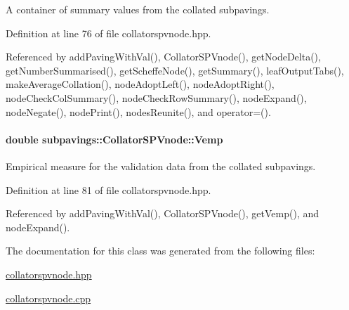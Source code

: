\-A container of summary values from the collated subpavings. 



\-Definition at line 76 of file collatorspvnode.\-hpp.



\-Referenced by add\-Paving\-With\-Val(), \-Collator\-S\-P\-Vnode(), get\-Node\-Delta(), get\-Number\-Summarised(), get\-Scheffe\-Node(), get\-Summary(), leaf\-Output\-Tabs(), make\-Average\-Collation(), node\-Adopt\-Left(), node\-Adopt\-Right(), node\-Check\-Col\-Summary(), node\-Check\-Row\-Summary(), node\-Expand(), node\-Negate(), node\-Print(), nodes\-Reunite(), and operator=().

\hypertarget{classsubpavings_1_1CollatorSPVnode_a31cd9926485cf1190effb77a9ce8dac4}{
\paragraph[{\-Vemp}]{\setlength{\rightskip}{0pt plus 5cm}double {\bf subpavings\-::\-Collator\-S\-P\-Vnode\-::\-Vemp}}}\label{classsubpavings_1_1CollatorSPVnode_a31cd9926485cf1190effb77a9ce8dac4}


\-Empirical measure for the validation data from the collated subpavings. 



\-Definition at line 81 of file collatorspvnode.\-hpp.



\-Referenced by add\-Paving\-With\-Val(), \-Collator\-S\-P\-Vnode(), get\-Vemp(), and node\-Expand().



\-The documentation for this class was generated from the following files\-:\begin{DoxyCompactItemize}
\item 
\hyperlink{collatorspvnode_8hpp}{collatorspvnode.\-hpp}\item 
\hyperlink{collatorspvnode_8cpp}{collatorspvnode.\-cpp}\end{DoxyCompactItemize}
